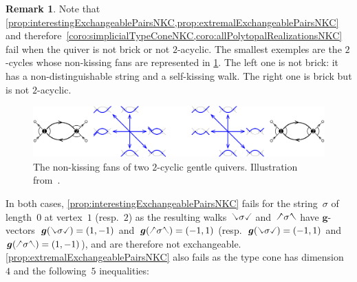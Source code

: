 \documentclass{amsart}
\theoremstyle{definition}
\newtheorem{remark}[theorem]{Remark}
\renewcommand{\b}[1]{{\boldsymbol{#1}}} %
\newcommand{\gvector}[1]{\b{g}(#1)} %
\newcommand{\hL}{\text{\rotatebox[origin=c]{180}{\checked}}}
\newcommand{\hR}{\text{\rotatebox[origin=c]{180}{\reflectbox{\checked}}}}
\newcommand{\cL}{\text{\reflectbox{\checked}}}
\newcommand{\cR}{\text{\checked}}
\newcommand{\hh}[1]{\hL#1\hR} %
\newcommand{\cc}[1]{\cL#1\cR} %
\begin{document}
\begin{remark}
\label{exm:nonSimplicialTypeConeNKC}
Note that \cref{prop:interestingExchangeablePairsNKC,prop:extremalExchangeablePairsNKC} and therefore~\cref{coro:simplicialTypeConeNKC,coro:allPolytopalRealizationsNKC} fail when the quiver is not brick or not $2$-acyclic.
The smallest exemples are the $2$-cycles whose non-kissing fans are represented in \cref{fig:nonkissingFans2}.
The left one is not brick: it has a non-distinguishable string and a self-kissing walk.
The right one is brick but is not $2$-acyclic.


\begin{figure}[h]
	\capstart
	\centerline{\includegraphics[scale=.45]{nonkissingFans2}}
	\caption{The non-kissing fans of two $2$-cyclic gentle quivers. Illustration from~\cite{PaluPilaudPlamondon-nonkissing}.}
	\label{fig:nonkissingFans2}
\end{figure}

In both cases, \cref{prop:interestingExchangeablePairsNKC} fails for the string~$\sigma$ of length~$0$ at vertex~$1$ (resp.~$2$) as the resulting walks~$\cc{\sigma}$ and~$\hh{\sigma}$ have $\b{g}$-vectors~$\gvector{\cc{\sigma}} = (1,-1)$ and~$\gvector{\hh{\sigma}} = (-1,1)$ (resp.~$\gvector{\cc{\sigma}} = (-1,1)$ and~$\gvector{\hh{\sigma}} = (1,-1)$), and are therefore not exchangeable.
\cref{prop:extremalExchangeablePairsNKC} also fails as the type cone has dimension~$4$ and the following~$5$ inequalities:


\end{remark}
\end{document}
